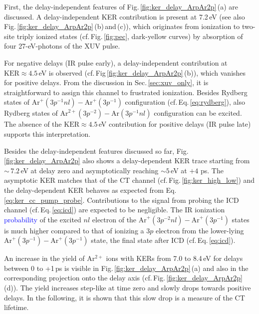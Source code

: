 \documentclass[%
 aip,
rsi,%
 amsmath,amssymb,
preprint,%
]{revtex4-1}
\begin{document}
First, the delay-independent features of \mbox{Fig.\,\ref{fig:ker_delay_ArpAr2p}}\,(a) are discussed. A delay-independent KER contribution is present at 7.2\,eV (see also Fig.\,\ref{fig:ker_delay_ArpAr2p}\,(b)\,and\,(c)), which originates from ionization to two-site triply ionized states (cf.\,Fig.\,\ref{fig:pec}, dark-yellow curves) by absorption of four 27-eV-photons of the XUV pulse.

For negative delays (IR pulse early), a delay-independent contribution at $\mathrm{KER} \approx 4.5$\,eV is observed (cf.\,Fig\,\ref{fig:ker_delay_ArpAr2p}\,(b)), which vanishes for positive delays. 
From the discussion in Sec.\,\ref{sec:xuv_only}, it is straightforward to assign this channel to frustrated ionization. Besides Rydberg states of $\mathrm{Ar}^{+}(3p^{-1}nl)-\mathrm{Ar}^{+}(3p^{-1})$ configuration (cf.\,Eq.\,\ref{eq:rydberg}), also Rydberg states of $\mathrm{Ar}^{2+}(3p^{-2})-\mathrm{Ar}(3p^{-1}nl)$ configuration can be excited. The absence of the $\mathrm{KER} \approx 4.5$\,eV contribution for positive delays (IR pulse late) supports this interpretation.

Besides the delay-independent features discussed so far, Fig.\,\ref{fig:ker_delay_ArpAr2p} also shows a delay-dependent KER trace starting from $\sim\,7.2$\,eV at delay zero and asymptotically reaching $\sim 5$\,eV at $+4\,$\,ps. The asymptotic KER matches that of the CT channel (cf.\,Fig.\,\ref{fig:ker_high_low}) and the delay-dependent KER behaves as expected from Eq.\,\ref{eq:ker_cc_pump_probe}. Contributions to the signal from probing the ICD channel (cf.\,Eq.\,\ref{eq:icd}) are expected to be negligible. The IR ionization \textcolor{blue}{probability} of the excited $nl$ electron of the $\mathrm{Ar}^+(3p^{-2}nl) - \mathrm{Ar}^{+}(3p^{-1})$ states is much higher compared to that of ionizing a $3p$ electron from the lower-lying $\mathrm{Ar}^+(3p^{-1}) - \mathrm{Ar}^{+}(3p^{-1})$ state, the final state after ICD (cf.\,Eq.\,\ref{eq:icd}). 

An increase in the yield of Ar$^{2+}$ ions with KERs from 7.0 to 8.4\,eV for delays between 0 to +1\,ps is visible in \mbox{Fig.\,\ref{fig:ker_delay_ArpAr2p}}\,(a) and also in the corresponding projection onto the delay axis (cf.\,Fig.\,\ref{fig:ker_delay_ArpAr2p}\,(d)). The yield increases step-like at time zero and slowly drops towards positive delays. 
In the following, it is shown that this slow drop is a measure of the CT lifetime. 
\end{document}
